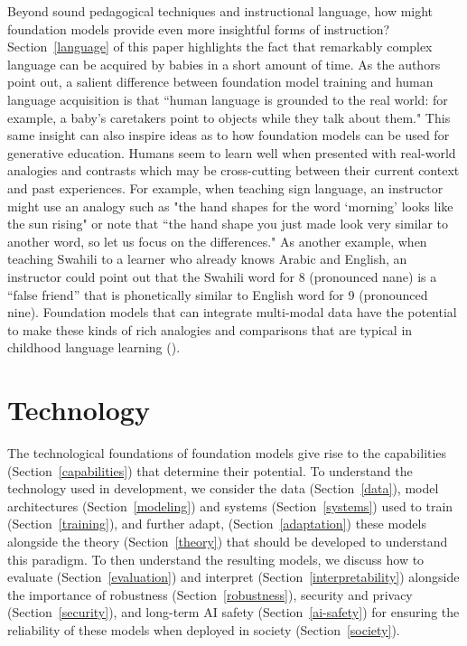 Beyond sound pedagogical techniques and instructional language, how might foundation models provide even more insightful forms of instruction? Section~\ref{language} of this paper highlights the fact that remarkably complex language can be acquired by babies in a short amount of time. As the authors point out, a salient difference between foundation model training and human language acquisition is that ``human language is grounded to the real world: for example, a baby’s caretakers point to objects while they talk about them." This same insight can also inspire ideas as to how foundation models can be used for generative education. Humans seem to learn well when presented with real-world analogies and contrasts which may be cross-cutting between their current context and past experiences. For example, when teaching sign language, an instructor might use an analogy such as "the hand shapes for the word `morning' looks like the sun rising" or note that ``the hand shape you just made look very similar to another word, so let us focus on the differences." As another example, when teaching Swahili to a learner who already knows Arabic and English, an instructor could point out that the Swahili word for 8 (pronounced nane) is a ``false friend'' that is phonetically similar to English word for 9 (pronounced nine). Foundation models that can integrate multi-modal data have the potential to make these kinds of rich analogies and comparisons that are typical in childhood language learning ().

\section{Technology}
\label{sec:technology}

The technological foundations of foundation models give rise to the capabilities (Section~\ref{capabilities}) that determine their potential. To understand the technology used in development, we consider the data (Section~\ref{data}), model architectures (Section~\ref{modeling}) and systems (Section~\ref{systems}) used to train (Section~\ref{training}), and further adapt, (Section~\ref{adaptation}) these models alongside the theory (Section~\ref{theory}) that should be developed to understand this paradigm. To then understand the resulting models, we discuss how to evaluate (Section~\ref{evaluation}) and interpret (Section~\ref{interpretability}) alongside the importance of robustness (Section~\ref{robustness}), security and privacy (Section~\ref{security}), and long-term AI safety (Section~\ref{ai-safety}) for ensuring the reliability of these models when deployed in society (Section~\ref{society}).

